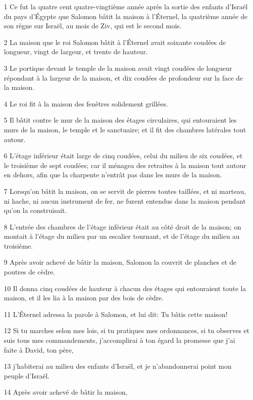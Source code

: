 \par 1 Ce fut la quatre cent quatre-vingtième année après la sortie des enfants d'Israël du pays d'Égypte que Salomon bâtit la maison à l'Éternel, la quatrième année de son règne sur Israël, au mois de Ziv, qui est le second mois.
\par 2 La maison que le roi Salomon bâtit à l'Éternel avait soixante coudées de longueur, vingt de largeur, et trente de hauteur.
\par 3 Le portique devant le temple de la maison avait vingt coudées de longueur répondant à la largeur de la maison, et dix coudées de profondeur sur la face de la maison.
\par 4 Le roi fit à la maison des fenêtres solidement grillées.
\par 5 Il bâtit contre le mur de la maison des étages circulaires, qui entouraient les murs de la maison, le temple et le sanctuaire; et il fit des chambres latérales tout autour.
\par 6 L'étage inférieur était large de cinq coudées, celui du milieu de six coudées, et le troisième de sept coudées; car il ménagea des retraites à la maison tout autour en dehors, afin que la charpente n'entrât pas dans les murs de la maison.
\par 7 Lorsqu'on bâtit la maison, on se servit de pierres toutes taillées, et ni marteau, ni hache, ni aucun instrument de fer, ne furent entendus dans la maison pendant qu'on la construisait.
\par 8 L'entrée des chambres de l'étage inférieur était au côté droit de la maison; on montait à l'étage du milieu par un escalier tournant, et de l'étage du milieu au troisième.
\par 9 Après avoir achevé de bâtir la maison, Salomon la couvrit de planches et de poutres de cèdre.
\par 10 Il donna cinq coudées de hauteur à chacun des étages qui entouraient toute la maison, et il les lia à la maison par des bois de cèdre.
\par 11 L'Éternel adressa la parole à Salomon, et lui dit: Tu bâtis cette maison!
\par 12 Si tu marches selon mes lois, si tu pratiques mes ordonnances, si tu observes et suis tous mes commandements, j'accomplirai à ton égard la promesse que j'ai faite à David, ton père,
\par 13 j'habiterai au milieu des enfants d'Israël, et je n'abandonnerai point mon peuple d'Israël.
\par 14 Après avoir achevé de bâtir la maison,

